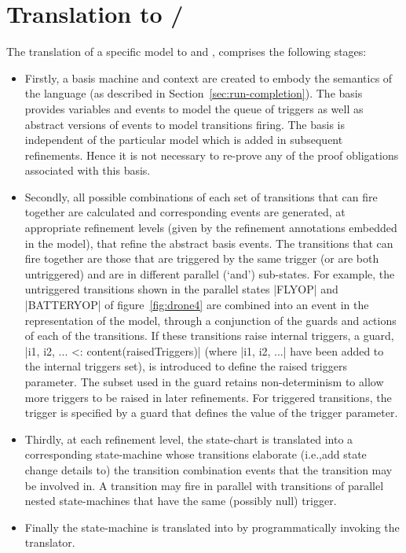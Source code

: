
\section{\SCXML Translation to \UMLB/\EventB}
\label{sec:translation}

The translation of a specific \SCXML model to \UMLB and  \EventB, comprises the following stages: 
\begin{itemize}
	\item 
Firstly, a basis machine and context are created to embody the semantics of the \SCXML language (as described in Section~\ref{sec:run-completion}).
The basis provides variables and events to model the queue of triggers as well as abstract versions of events to model transitions firing.
The basis is independent of the particular \SCXML model which is added in subsequent refinements.
Hence it is not necessary to re-prove any of the proof obligations associated with this basis.
	\item 
Secondly, all possible combinations of each set of transitions that can fire together are calculated and corresponding events are generated, at appropriate refinement levels (given by the refinement annotations embedded in the \SCXML model), that refine the abstract basis events.
The transitions that can fire together are those that are triggered by the same trigger (or are both untriggered) and are in different parallel (`and') sub-states.
For example, the untriggered transitions shown in the parallel states |FLYOP| and |BATTERYOP| of
figure~\ref{fig:drone4} are combined into an event in the \EventB representation of the model, 
through a conjunction of the guards and actions of each of the transitions. 
If these transitions raise internal triggers, a guard, |{i1, i2, ...} <: content(raisedTriggers)| (where |i1, i2, ...| have been added to the internal triggers set), is introduced to define the raised triggers parameter. 
The subset used in the guard retains non-determinism to allow more triggers to be raised in later refinements.
For triggered transitions, the trigger is specified by a guard that defines the value of the trigger parameter. 
	\item 
Thirdly, at each refinement level, the \SCXML state-chart is translated into a corresponding \UMLB state-machine whose transitions elaborate (i.e.,add state change details to) the transition combination events that the transition may be involved in.
A transition may fire in parallel with transitions of parallel nested state-machines that have the same (possibly null) trigger.
	\item
Finally the \UMLB state-machine is translated into \EVENTB by programmatically invoking the \UMLB translator.
\end{itemize}

